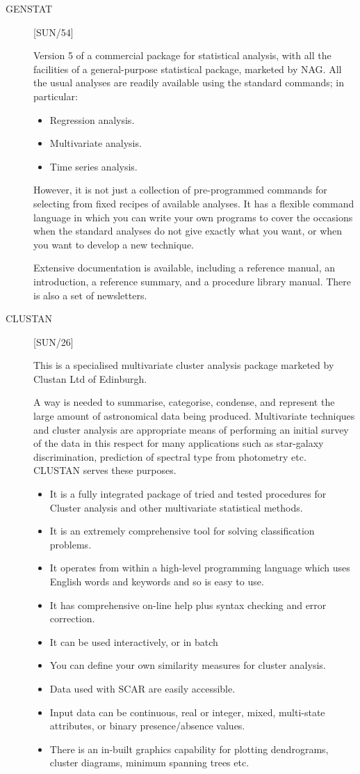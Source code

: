 \begin{description}

\item [GENSTAT] \hfill [SUN/54]

Version 5 of a commercial package for statistical analysis, with all the
facilities of a general-purpose statistical package, marketed by NAG.
All the usual analyses are readily available using the standard commands;
in particular:
\begin{itemize}
\item Regression analysis.
\item Multivariate analysis.
\item Time series analysis.
\end{itemize}
However, it is not just a collection of pre-programmed commands for
selecting from fixed recipes of available analyses.
It has a flexible command language in which you can write your own programs to
cover the occasions when the standard analyses do not give exactly what you
want, or when you want to develop a new technique.

Extensive documentation is available, including a reference manual, an
introduction, a reference summary, and a procedure library manual.
There is also a set of newsletters.

\item [CLUSTAN] \hfill [SUN/26]

This is a specialised multivariate cluster analysis package marketed by
Clustan Ltd of Edinburgh.

A way is needed to summarise, categorise, condense, and represent the large
amount of astronomical data being produced.
Multivariate techniques and cluster analysis are appropriate means of
performing an initial survey of the data in this respect for many applications
such as star-galaxy discrimination, prediction of spectral type from
photometry etc.
CLUSTAN serves these purposes.
\begin{itemize}
\item It is a fully integrated package of tried and tested procedures for
 Cluster analysis and other multivariate statistical methods.
\item It is an extremely comprehensive tool for solving classification
 problems.
\item It operates from within a high-level programming language which uses
 English words and keywords and so is easy to use.
\item It has comprehensive on-line help plus syntax checking and error
 correction.
\item It can be used interactively, or in batch
\item You can define your own similarity measures for cluster analysis.
\item Data used with SCAR are easily accessible.
\item Input data can be continuous, real or integer, mixed, multi-state
 attributes, or binary presence/absence values.
\item There is an in-built graphics capability for plotting dendrograms,
 cluster diagrams, minimum spanning trees etc.
\end{itemize}


\end{description}

